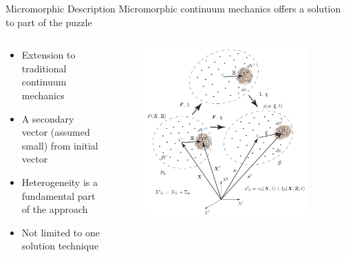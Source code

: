 \documentclass[11pt]{beamer}
\begin{document}
\begin{frame}{Micromorphic Description}
Micromorphic continuum mechanics offers a solution to part of the puzzle
\begin{columns}
\begin{column}{0.5\textwidth}
\begin{itemize}
\item Extension to traditional continuum mechanics
\item A secondary vector (assumed small) from initial vector
\item Heterogeneity is a fundamental part of the approach
\item Not limited to one solution technique
\end{itemize}
\end{column}
\begin{column}{0.5\textwidth}
\begin{figure}
\centering
\includegraphics[width=0.9\textwidth]{micromorphic.png}
\end{figure}
\end{column}
\end{columns}
\end{frame}
\end{document}
